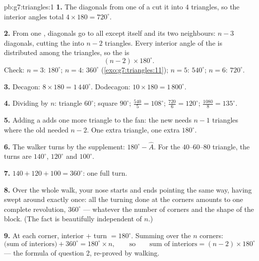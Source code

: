 \begin{solution}{pb:g7:triangles:1}
\textbf{1.} The diagonals from one  of a  cut it
into $4$ triangles, so the interior angles total
$4 \times 180 = 720^\circ$.

\textbf{2.} From one , diagonals go to all  except
itself and its two neighbours: $n - 3$ diagonals, cutting the
 into $n - 2$ triangles. Every interior angle of the
 is distributed among the triangles, so the  is
\[
(n - 2) \times 180^\circ .
\]
Check: $n = 3$: $180^\circ$; $n = 4$: $360^\circ$
(\cref{exo:g7:triangles:11}); $n = 5$: $540^\circ$; $n = 6$:
$720^\circ$.

\textbf{3.} Decagon: $8 \times 180 = 1\,440^\circ$. Dodecagon:
$10 \times 180 = 1\,800^\circ$.

\textbf{4.} Dividing by $n$: triangle $60^\circ$; square
$90^\circ$;  $\frac{540}{5} = 108^\circ$; 
$\frac{720}{6} = 120^\circ$;  $\frac{1080}{8} =
135^\circ$.

\textbf{5.} Adding a  adds one more triangle to the fan:
the new  needs $n - 1$ triangles where the old needed
$n - 2$. One extra triangle, one extra $180^\circ$.

\textbf{6.} The walker turns by the supplement:
$180^\circ - \widehat A$. For the $40$--$60$--$80$ triangle, the
turns are $140^\circ$, $120^\circ$ and $100^\circ$.

\textbf{7.} $140 + 120 + 100 = 360^\circ$: one full turn.

\textbf{8.} Over the whole walk, your nose starts and ends
pointing the same way, having swept around exactly once: all the
turning done at the corners amounts to one complete revolution,
$360^\circ$ --- whatever the number of corners and the shape of
the block. (The fact is beautifully independent of $n$.)

\textbf{9.} At each corner, interior $+$ turn $= 180^\circ$.
Summing over the $n$ corners:
\[
\text{(sum of interiors)} + 360^\circ = 180^\circ \times n,
\qquad\text{so}\qquad
\text{sum of interiors} = (n - 2) \times 180^\circ
\]
--- the formula of question 2, re-proved by walking.


\end{solution}
